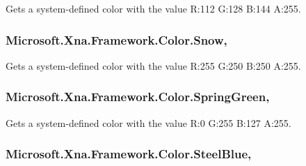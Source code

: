 Gets a system-\/defined color with the value R\+:112 G\+:128 B\+:144 A\+:255.

\hypertarget{struct_microsoft_1_1_xna_1_1_framework_1_1_color_aa5de5b0cb8d037ade2aea36f9d5a00c7}{}
\subsubsection[{Snow}]{ Microsoft.\+Xna.\+Framework.\+Color.\+Snow\hspace{0.3cm}{\ttfamily [static]}, {\ttfamily [get]}}\label{struct_microsoft_1_1_xna_1_1_framework_1_1_color_aa5de5b0cb8d037ade2aea36f9d5a00c7}


Gets a system-\/defined color with the value R\+:255 G\+:250 B\+:250 A\+:255.

\hypertarget{struct_microsoft_1_1_xna_1_1_framework_1_1_color_a69e6aecab8d5afd80a292db4d9e753c8}{}
\subsubsection[{Spring\+Green}]{ Microsoft.\+Xna.\+Framework.\+Color.\+Spring\+Green\hspace{0.3cm}{\ttfamily [static]}, {\ttfamily [get]}}\label{struct_microsoft_1_1_xna_1_1_framework_1_1_color_a69e6aecab8d5afd80a292db4d9e753c8}


Gets a system-\/defined color with the value R\+:0 G\+:255 B\+:127 A\+:255.

\hypertarget{struct_microsoft_1_1_xna_1_1_framework_1_1_color_ab654b2c139b5d974fbd4eb4c0d516c5c}{}
\subsubsection[{Steel\+Blue}]{ Microsoft.\+Xna.\+Framework.\+Color.\+Steel\+Blue\hspace{0.3cm}{\ttfamily [static]}, {\ttfamily [get]}}\label{struct_microsoft_1_1_xna_1_1_framework_1_1_color_ab654b2c139b5d974fbd4eb4c0d516c5c}


